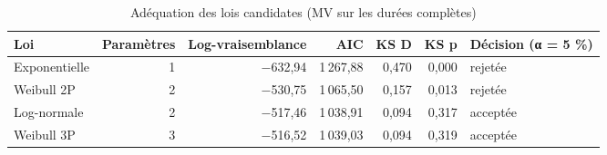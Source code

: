 \begin{table}[htbp]
\centering
\caption{Adéquation des lois candidates (MV sur les durées complètes)}
\label{tab:fiabilite_adequation}
\begin{tabular}{lrrrrrl}
\toprule
Loi & Paramètres & Log-vraisemblance & AIC & KS D & KS p & Décision (α = 5 \%) \\
\midrule
Exponentielle & 1 & −632,94 & 1 267,88 & 0,470 & 0,000 & rejetée \\
Weibull 2P & 2 & −530,75 & 1 065,50 & 0,157 & 0,013 & rejetée \\
Log-normale & 2 & −517,46 & 1 038,91 & 0,094 & 0,317 & acceptée \\
Weibull 3P & 3 & −516,52 & 1 039,03 & 0,094 & 0,319 & acceptée \\
\bottomrule
\end{tabular}
\end{table}
